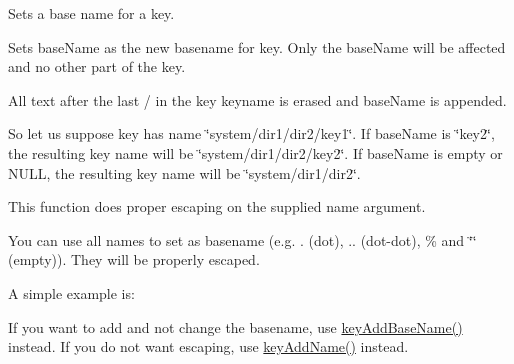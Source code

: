 Sets a base name for a key. 

Sets {\ttfamily base\+Name} as the new basename for {\ttfamily key}. Only the base\+Name will be affected and no other part of the key.

All text after the last {\ttfamily \textquotesingle{}/\textquotesingle{}} in the {\ttfamily key} keyname is erased and {\ttfamily base\+Name} is appended.

So let us suppose {\ttfamily key} has name {\ttfamily \char`\"{}system/dir1/dir2/key1\char`\"{}}. If {\ttfamily base\+Name} is {\ttfamily \char`\"{}key2\char`\"{}}, the resulting key name will be {\ttfamily \char`\"{}system/dir1/dir2/key2\char`\"{}}. If {\ttfamily base\+Name} is empty or N\+U\+LL, the resulting key name will be {\ttfamily \char`\"{}system/dir1/dir2\char`\"{}}.

This function does proper escaping on the supplied name argument.

You can use all names to set as basename (e.\+g. . (dot), .. (dot-\/dot), \% and \char`\"{}\char`\"{} (empty)). They will be properly escaped.

A simple example is\+: 
 If you want to add and not change the basename, use \hyperlink{group__keyname_gaa942091fc4bd5c2699e49ddc50829524}{key\+Add\+Base\+Name()} instead. If you do not want escaping, use \hyperlink{group__keyname_gaa70593a2c772c4b7bc33423b9b10a270}{key\+Add\+Name()} instead.

